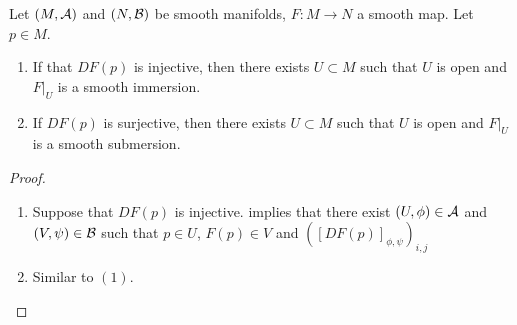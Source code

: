 \documentclass{book}
\begin{document}
	\begin{ex} 
	Let $(M, \mathcal{A})$ and $(N, \mathcal{B})$ be smooth manifolds, $F: M \rightarrow N$ a smooth map. Let $p \in M$.
	\begin{enumerate}
		\item If that $DF(p)$ is injective, then there exists $U \subset M$ such that $U$ is open and $F|_U$ is a smooth immersion.
		\item If $DF(p)$ is surjective, then there exists $U \subset M$ such that $U$ is open and $F|_U$ is a smooth submersion.
	\end{enumerate}
	\end{ex}

	\begin{proof}\
		\begin{enumerate}
			\item Suppose that $DF(p)$ is injective.  implies that there exist $(U, \phi) \in \mathcal{A}$ and $(V, \psi) \in \mathcal{B}$ such that $p \in U$, $F(p) \in V$ and $([DF(p)]_{\phi, \psi})_{i,j}$
			\item Similar to $(1)$. 
		\end{enumerate}
	\end{proof}
\end{document}
